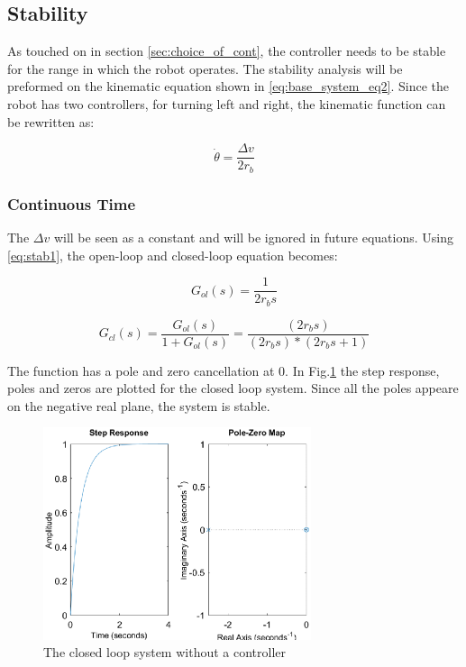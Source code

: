 \subsection{Stability}
As touched on in section \ref{sec:choice_of_cont}, the controller needs to be stable for the range in which the robot operates. The stability analysis will be preformed on the kinematic equation shown in \eqref{eq:base_system_eq2}. Since the robot has two controllers, for turning left and right, the kinematic function can be rewritten as:

\begin{equation}
    \Dot{\theta} = \frac{\Delta v}{2r_b} 
    \label{eq:stab1}
\end{equation}

\subsubsection{Continuous Time}

The $\Delta v$ will be seen as a constant and will be ignored in future equations. Using \eqref{eq:stab1}, the open-loop and closed-loop equation becomes:

\begin{equation}
    G_{ol}(s)=\frac{1}{2 r_b s}
\end{equation}

\begin{equation}
    G_{cl}(s)=\frac{G_{ol}(s)}{1+G_{ol}(s)}=\frac{(2r_b s)}{(2r_b s)*(2r_b s + 1)}
\end{equation}

\noindent The function has a pole and zero cancellation at 0. In Fig.\ref{fig:step1} the step response, poles and zeros are plotted for the closed loop system. Since all the poles appeare on the negative real plane, the system is stable.

\begin{figure}
    \centering
    \includegraphics[width=0.7\textwidth]{img/closed_loop_step.eps}
    \caption{The closed loop system without a controller}
    \label{fig:step1}
\end{figure}

